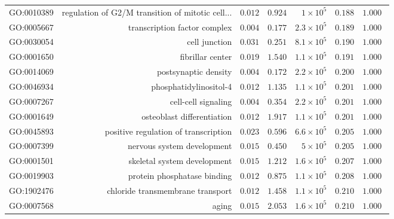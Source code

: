 \documentclass{article}
\begin{document}
\begin{longtable}{|l|r|r|r|r|r|r|}
GO:0010389 & regulation of G2/M transition of mitotic cell... & $ 0.012$ & $ 0.924$ & $ 1\times 10^{5}$ & $ 0.188$ & $ 1.000~~$ \\
GO:0005667 & transcription factor complex & $ 0.004$ & $ 0.177$ & $2.3\times 10^{5}$ & $ 0.189$ & $ 1.000~~$ \\
GO:0030054 & cell junction & $ 0.031$ & $ 0.251$ & $8.1\times 10^{5}$ & $ 0.190$ & $ 1.000~~$ \\
GO:0001650 & fibrillar center & $ 0.019$ & $ 1.540$ & $1.1\times 10^{5}$ & $ 0.191$ & $ 1.000~~$ \\
GO:0014069 & postsynaptic density & $ 0.004$ & $ 0.172$ & $2.2\times 10^{5}$ & $ 0.200$ & $ 1.000~~$ \\
GO:0046934 & phosphatidylinositol-4 & $ 0.012$ & $ 1.135$ & $1.1\times 10^{5}$ & $ 0.201$ & $ 1.000~~$ \\
GO:0007267 & cell-cell signaling & $ 0.004$ & $ 0.354$ & $2.2\times 10^{5}$ & $ 0.201$ & $ 1.000~~$ \\
GO:0001649 & osteoblast differentiation & $ 0.012$ & $ 1.917$ & $1.1\times 10^{5}$ & $ 0.201$ & $ 1.000~~$ \\
GO:0045893 & positive regulation of transcription & $ 0.023$ & $ 0.596$ & $6.6\times 10^{5}$ & $ 0.205$ & $ 1.000~~$ \\
GO:0007399 & nervous system development & $ 0.015$ & $ 0.450$ & $ 5\times 10^{5}$ & $ 0.205$ & $ 1.000~~$ \\
GO:0001501 & skeletal system development & $ 0.015$ & $ 1.212$ & $1.6\times 10^{5}$ & $ 0.207$ & $ 1.000~~$ \\
GO:0019903 & protein phosphatase binding & $ 0.012$ & $ 0.875$ & $1.1\times 10^{5}$ & $ 0.208$ & $ 1.000~~$ \\
GO:1902476 & chloride transmembrane transport & $ 0.012$ & $ 1.458$ & $1.1\times 10^{5}$ & $ 0.210$ & $ 1.000~~$ \\
GO:0007568 & aging & $ 0.015$ & $ 2.053$ & $1.6\times 10^{5}$ & $ 0.210$ & $ 1.000~~$ \\
\end{longtable}
\end{document}
